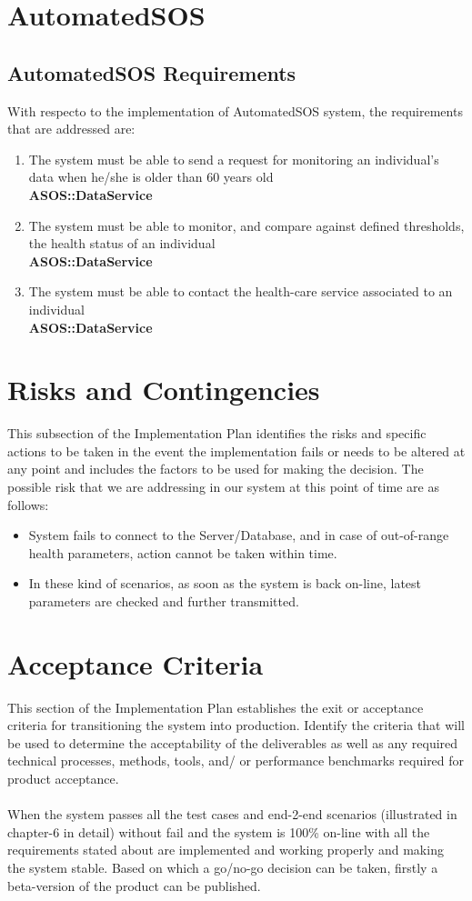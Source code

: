 \documentclass[a4paper, hidelinks, 12pt]{report}
\newcommand\requirement[1]{\item[{[R#1]}] }
\begin{document}
\section{\textbf{AutomatedSOS}}
\subsection{AutomatedSOS Requirements}
	With respecto to the implementation of AutomatedSOS system, the requirements that are addressed are:
	\begin{enumerate}
		\requirement{13} The system must be able to send a request for monitoring an individual's data when he/she is older than 60 years old \\
		\textbf{ASOS::DataService}
		\requirement{14} The system must be able to monitor, and compare against defined thresholds, the health status of an individual \\
		\textbf{ASOS::DataService}
		\requirement{15} The system must be able to contact the health-care service associated to an individual \\
		\textbf{ASOS::DataService}
	\end{enumerate}

\section{Risks and Contingencies}
This subsection of the Implementation Plan identifies the risks and specific actions to be taken in the event the implementation fails or needs to be altered at any point and includes the factors to be used for making the decision. The possible risk that we are addressing in our system at this point of time are as follows:
\begin{itemize}
\item{} System fails to connect to the Server/Database, and in case of out-of-range health parameters, action cannot be taken within time.
\item{} In these kind of scenarios, as soon as the system is back on-line, latest parameters are checked and further transmitted.
\end{itemize}

\section{Acceptance Criteria}
This section of the Implementation Plan establishes the exit or acceptance criteria for transitioning the system into production. Identify the criteria that will be used to determine the acceptability of the deliverables as well as any required technical processes, methods, tools, and/ or performance benchmarks required for product acceptance. \\\\
When the system passes all the test cases and end-2-end scenarios (illustrated in chapter-6 in detail) without fail and the system is 100\% on-line with all the requirements stated about are implemented and working properly and making the system stable. Based on which a go/no-go decision can be taken, firstly a beta-version of the product can be published.
\end{document}

